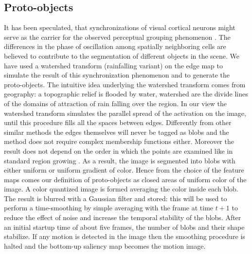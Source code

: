 \documentclass{llncs}
\begin{document}
\subsection{Proto-objects}
\label{sec:att_protoobj}
It has been speculated, that synchronizations of visual
cortical neurons might serve as the carrier for the
observed perceptual grouping phenomenon \cite{EckhornBJBKMR88,GrayKES89}.
The differences in the phase of oscillation among
spatially neighboring cells are believed to contribute to
the segmentation of different objects in the scene.
We have used a watershed transform (rainfalling
variant) \cite{Smet00} on the edge map to simulate the result of
this synchronization phenomenon and to generate the
proto-objects.
The intuitive idea underlying the watershed transform comes from
geography: a topographic relief is flooded by water,
watershed are the divide lines of the domains of
attraction of rain falling over the region. In our view
the watershed transform simulates the parallel spread
of the activation on the image, until this procedure fills
all the spaces between edges. Differently from other
similar methods the edges themselves will never be
tagged as blobs and the method does not require
complex membership functions either. Moreover the
result does not depend on the order in which the points
are examined like in standard region growing \cite{WanH03}. As
a result, the image is segmented into blobs with either
uniform or uniform gradient of color. Hence from the choice
of the feature maps comes our definition of proto-objects
as closed areas of uniform color of the image.
A color quantized image is formed averaging the color inside
each blob. The result is blurred with a
Gaussian filter and stored: this will be used to perform
a time-smoothing by simple averaging with the frame
at time $t+1$ to reduce the effect of noise and increase
the temporal stability of the blobs. After an initial
startup time of about five frames, the number of blobs
and their shape stabilize. If any motion is detected in
the image then the smoothing procedure is halted and the
bottom-up saliency map becomes the motion image.
\end{document}
